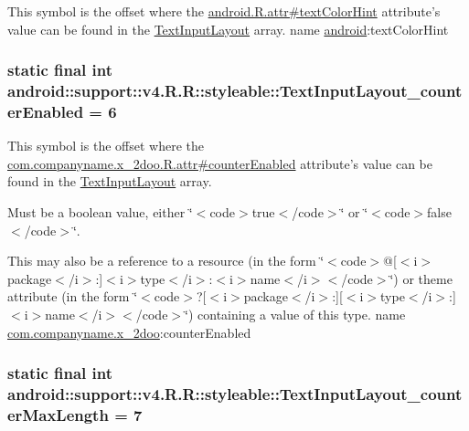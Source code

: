 This symbol is the offset where the \hyperlink{}{android.R.attr\#textColorHint} attribute's value can be found in the \hyperlink{classandroid_1_1support_1_1v4_1_1_r_1_1styleable_880beb171ce483ab1b63a82ef7f9d976}{TextInputLayout} array.  name \hyperlink{namespaceandroid}{android}:textColorHint \hypertarget{classandroid_1_1support_1_1v4_1_1_r_1_1styleable_93a894bdcf077508cc30b9d7bfa9662d}{
\subsubsection[{TextInputLayout\_\-counterEnabled}]{\setlength{\rightskip}{0pt plus 5cm}static final int android::support::v4.R.R::styleable::TextInputLayout\_\-counterEnabled = 6}}
\label{classandroid_1_1support_1_1v4_1_1_r_1_1styleable_93a894bdcf077508cc30b9d7bfa9662d}


This symbol is the offset where the \hyperlink{classcom_1_1companyname_1_1x__2doo_1_1_r_1_1attr_0c9634c4017ec24e3f9b9027c162ee16}{com.companyname.x\_\-2doo.R.attr\#counterEnabled} attribute's value can be found in the \hyperlink{classandroid_1_1support_1_1v4_1_1_r_1_1styleable_880beb171ce483ab1b63a82ef7f9d976}{TextInputLayout} array.

Must be a boolean value, either \char`\"{}$<$code$>$true$<$/code$>$\char`\"{} or \char`\"{}$<$code$>$false$<$/code$>$\char`\"{}. 

This may also be a reference to a resource (in the form \char`\"{}$<$code$>$@\mbox{[}$<$i$>$package$<$/i$>$:\mbox{]}$<$i$>$type$<$/i$>$:$<$i$>$name$<$/i$>$$<$/code$>$\char`\"{}) or theme attribute (in the form \char`\"{}$<$code$>$?\mbox{[}$<$i$>$package$<$/i$>$:\mbox{]}\mbox{[}$<$i$>$type$<$/i$>$:\mbox{]}$<$i$>$name$<$/i$>$$<$/code$>$\char`\"{}) containing a value of this type.  name \hyperlink{namespacecom_1_1companyname_1_1x__2doo}{com.companyname.x\_\-2doo}:counterEnabled \hypertarget{classandroid_1_1support_1_1v4_1_1_r_1_1styleable_a890e200b03fe1fa48be3fe870435e18}{
\subsubsection[{TextInputLayout\_\-counterMaxLength}]{\setlength{\rightskip}{0pt plus 5cm}static final int android::support::v4.R.R::styleable::TextInputLayout\_\-counterMaxLength = 7}}
\label{classandroid_1_1support_1_1v4_1_1_r_1_1styleable_a890e200b03fe1fa48be3fe870435e18}


